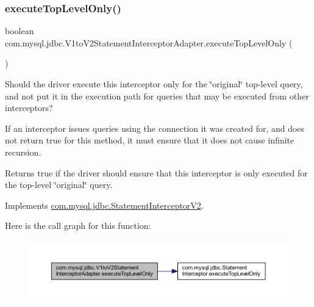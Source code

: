 \subsubsection{\texorpdfstring{execute\+Top\+Level\+Only()}{executeTopLevelOnly()}}
{\footnotesize\ttfamily boolean com.\+mysql.\+jdbc.\+V1to\+V2\+Statement\+Interceptor\+Adapter.\+execute\+Top\+Level\+Only (\begin{DoxyParamCaption}{ }\end{DoxyParamCaption})}

Should the driver execute this interceptor only for the \char`\"{}original\char`\"{} top-\/level query, and not put it in the execution path for queries that may be executed from other interceptors?

If an interceptor issues queries using the connection it was created for, and does not return {\ttfamily true} for this method, it must ensure that it does not cause infinite recursion.

\begin{DoxyReturn}{Returns}
true if the driver should ensure that this interceptor is only executed for the top-\/level \char`\"{}original\char`\"{} query. 
\end{DoxyReturn}


Implements \mbox{\hyperlink{interfacecom_1_1mysql_1_1jdbc_1_1_statement_interceptor_v2_a36f03c5f5b1755d48549862d5b6c627f}{com.\+mysql.\+jdbc.\+Statement\+Interceptor\+V2}}.

Here is the call graph for this function\+:
\nopagebreak
\begin{figure}[H]
\begin{center}
\leavevmode
\includegraphics[width=350pt]{classcom_1_1mysql_1_1jdbc_1_1_v1to_v2_statement_interceptor_adapter_aa5c3d7a91f90891f02b1a33310e4efb6_cgraph}
\end{center}
\end{figure}
\mbox{\label{classcom_1_1mysql_1_1jdbc_1_1_v1to_v2_statement_interceptor_adapter_acf5784b9b687c7d58d92492e2bd6a800}} 
